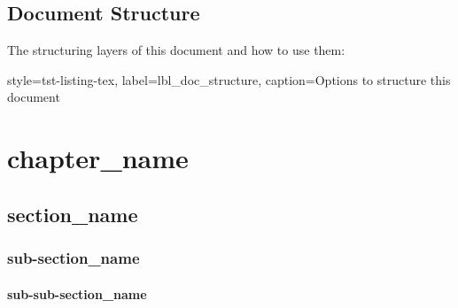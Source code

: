 \section{Document Structure}
The structuring layers of this document and how to use them:
\begin{sscodeenv_default}{%
    style=tst-listing-tex,%
    label=lbl_doc_structure,%
    caption=Options to structure this document}
    \chapter{chapter_name}
    \section{section_name}
    \subsection{sub-section_name}
    \subsubsection{sub-sub-section_name}
\end{sscodeenv_default}
